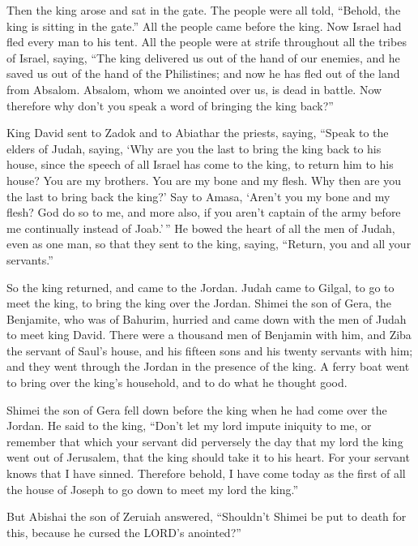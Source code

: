  Then the king arose and sat in the gate. The people were
all told, ``Behold, the king is sitting in the gate.'' All the people
came before the king. Now Israel had fled every man to his tent.
 All the people were at strife throughout all the tribes of
Israel, saying, ``The king delivered us out of the hand of our enemies,
and he saved us out of the hand of the Philistines; and now he has fled
out of the land from Absalom.  Absalom, whom we anointed
over us, is dead in battle. Now therefore why don't you speak a word of
bringing the king back?''

 King David sent to Zadok and to Abiathar the priests,
saying, ``Speak to the elders of Judah, saying, `Why are you the last to
bring the king back to his house, since the speech of all Israel has
come to the king, to return him to his house?  You are my
brothers. You are my bone and my flesh. Why then are you the last to
bring back the king?'  Say to Amasa, `Aren't you my bone
and my flesh? God do so to me, and more also, if you aren't captain of
the army before me continually instead of Joab.'\,''  He
bowed the heart of all the men of Judah, even as one man, so that they
sent to the king, saying, ``Return, you and all your servants.''

 So the king returned, and came to the Jordan. Judah came
to Gilgal, to go to meet the king, to bring the king over the Jordan.
 Shimei the son of Gera, the Benjamite, who was of Bahurim,
hurried and came down with the men of Judah to meet king David.
 There were a thousand men of Benjamin with him, and Ziba
the servant of Saul's house, and his fifteen sons and his twenty
servants with him; and they went through the Jordan in the presence of
the king.  A ferry boat went to bring over the king's
household, and to do what he thought good.

Shimei the son of Gera fell down before the king when he had come over
the Jordan.  He said to the king, ``Don't let my lord
impute iniquity to me, or remember that which your servant did
perversely the day that my lord the king went out of Jerusalem, that the
king should take it to his heart.  For your servant knows
that I have sinned. Therefore behold, I have come today as the first of
all the house of Joseph to go down to meet my lord the king.''

 But Abishai the son of Zeruiah answered, ``Shouldn't
Shimei be put to death for this, because he cursed the LORD's
anointed?''

